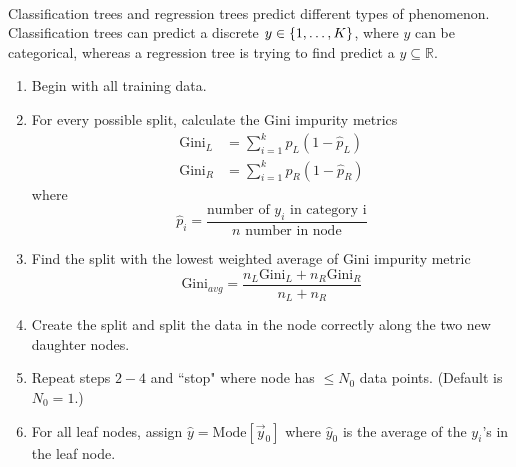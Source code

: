 \documentclass[12pt]{article}
\begin{document}
\begin{enumerate}

\\ Classification trees and regression trees predict different types of phenomenon. Classification trees can predict a discrete $y \in \left\{1,\dots,K\right\}$, where $y$ can be categorical, whereas a regression tree is trying to find predict a $y \subseteq \mathbb{R}$. 

\begin{enumerate} 
\item Begin with all training data. 
\item For every possible split, calculate the Gini impurity metrics $$ \begin{aligned} \text{Gini}_L &= \sum_{i=1}^k \hat{p}_L(1 - \hat{p}_L) \\ \text{Gini}_R &= \sum_{i=1}^k \hat{p}_R(1 - \hat{p}_R) \end{aligned} $$ where $$ \hat{p}_i = \frac{\text{number of $y_i$ in category i}}{n\text{ number in node}} $$ 
\item Find the split with the lowest weighted average of Gini impurity metric $$ \text{Gini}_{avg} = \frac{n_L \text{Gini}_L + n_R \text{Gini}_R}{n_L + n_R} $$ 
\item Create the split and split the data in the node correctly along the two new daughter nodes. 
\item Repeat steps $2-4$ and ``stop" where node has $\leq N_0$ data points. (Default is $N_0 = 1$.)
\item For all leaf nodes, assign $\hat{y} = \text{Mode}[\vec{y}_0]$ where $\hat{y}_0$ is the average of the $y_i$'s in the leaf node. \end{enumerate} 


\end{enumerate}

\end{document}
